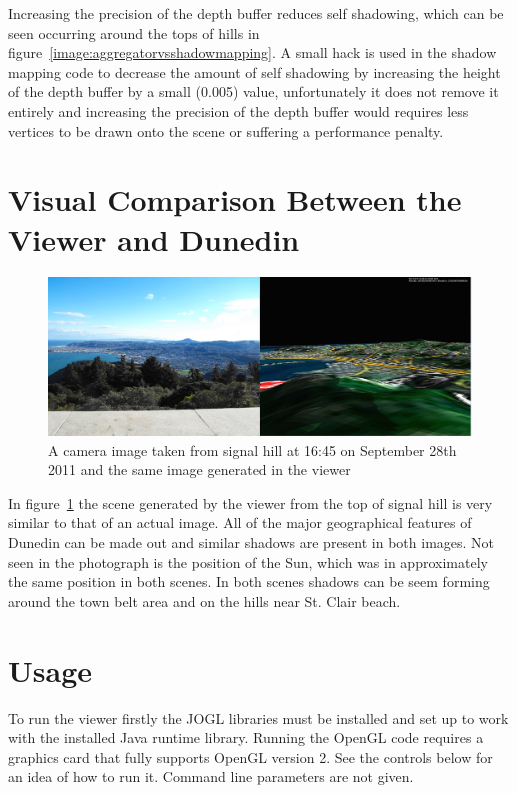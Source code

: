 \documentclass[12pt]{report}
\begin{document}
Increasing the precision of the depth buffer reduces self shadowing, which can be seen occurring around the tops of hills in figure~\ref{image:aggregatorvsshadowmapping}. A small hack is used in the shadow mapping code to decrease the amount of self shadowing by increasing the height of the depth buffer by a small (0.005) value, unfortunately it does not remove it entirely and increasing the precision of the depth buffer would requires less vertices to be drawn onto the scene or suffering a performance penalty.

\section{Visual Comparison Between the Viewer and Dunedin}
\begin{figure}[h]
\centering
\includegraphics[width=\textwidth]{realvsviewer.jpg}
\caption{A camera image taken from signal hill at 16:45 on September 28th 2011 and the same image generated in the viewer}
\label{image:realvsviewer}
\end{figure}

In figure~\ref{image:realvsviewer} the scene generated by the viewer from the top of signal hill is very similar to that of an actual image. All of the major geographical features of Dunedin can be made out and similar shadows are present in both images. Not seen in the photograph is the position of the Sun, which was in approximately the same position in both scenes. In both scenes shadows can be seem forming around the town belt area and on the hills near St. Clair beach.

\section{Usage}

To run the viewer firstly the JOGL libraries must be installed and set up to work with the installed Java runtime library. Running the OpenGL code requires a graphics card that fully supports OpenGL version 2. See the controls below for an idea of how to run it. Command line parameters are not given.
\end{document}
